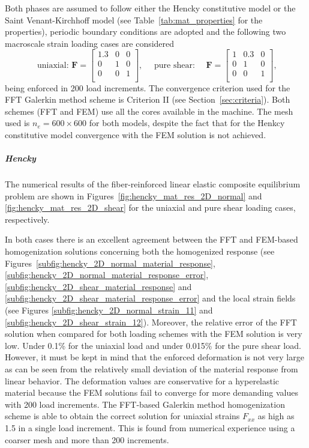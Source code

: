 Both phases are assumed to follow either the Hencky constitutive model or the Saint Venant-Kirchhoff model (see Table~\ref{tab:mat_properties} for the properties), periodic boundary conditions are adopted and the following two macroscale strain loading cases are considered
\begin{equation}
\text { uniaxial: } \bm{F}=\left[\begin{array}{ccc}
1.3 & 0 & 0 \\
0 & 1 & 0  \\
0 & 0 & 1  \\
\end{array}\right], \quad \text { pure shear: } \quad \bm F=\left[\begin{array}{ccc}
1 & 0.3 & 0 \\
0 & 1 & 0  \\
0 & 0 & 1  \\
\end{array}\right],
\end{equation}
being enforced in 200 load increments.
The convergence criterion used for the FFT Galerkin method scheme is Criterion II (see Section~\ref{sec:criteria}).
Both schemes (FFT and FEM) use all the cores available in the machine.
The mesh used is \(n_e=600\times 600\) for both models, despite the fact that for the Henkcy constitutive model convergence with the FEM solution is not achieved.

\subparagraph{Hencky}
\label{sec:hencky_accuracy_validation}

The numerical results of the fiber-reinforced linear elastic composite equilibrium problem are shown in Figures~\ref{fig:hencky_mat_res_2D_normal} and \ref{fig:hencky_mat_res_2D_shear} for the uniaxial and pure shear loading cases, respectively.

In both cases there is an excellent agreement between the FFT and FEM-based homogenization solutions concerning both the homogenized response (see Figures~\ref{subfig:hencky_2D_normal_material_response}, \ref{subfig:hencky_2D_normal_material_response_error}, \ref{subfig:hencky_2D_shear_material_response} and \ref{subfig:hencky_2D_shear_material_response_error} and the local strain fields (see Figures \ref{subfig:hencky_2D_normal_strain_11} and \ref{subfig:hencky_2D_shear_strain_12}).
Moreover, the relative error of the FFT solution when compared for both loading schemes with the FEM solution is very low.
Under 0.1\% for the uniaxial load and under 0.015\% for the pure shear load.
However, it must be kept in mind that the enforced deformation is not very large as can be seen from the relatively small deviation of the material response from linear behavior.
The deformation values are conservative for a hyperelastic material because the FEM solutions fail to converge for more demanding values with 200 load increments.
The FFT-based Galerkin method homogenization scheme is able to obtain the correct solution for uniaxial strains \(F_{xx}\) as high as 1.5 in a single load increment.
This is found from numerical experience using a coarser mesh and more than 200 increments.

